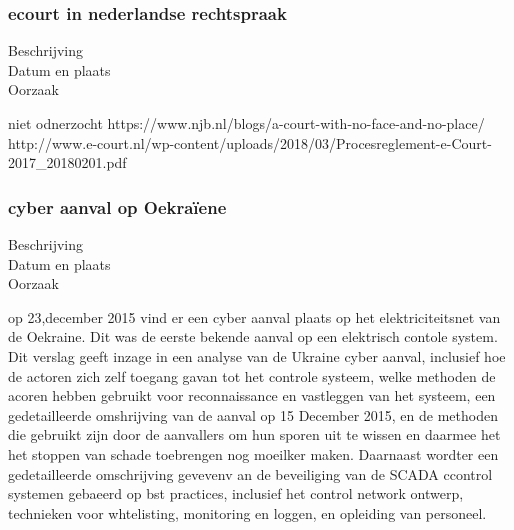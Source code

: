 \subsubsection{ecourt in nederlandse rechtspraak}

\begin{description}
\item[Beschrijving]
\item[Datum en plaats] 
\item[Oorzaak]
\end{description}
niet odnerzocht
https://www.njb.nl/blogs/a-court-with-no-face-and-no-place/ 
\cite{sprongken19032018CourtProcedureDigital}
http://www.e-court.nl/wp-content/uploads/2018/03/Procesreglement-e-Court-2017_20180201.pdf
\cite{PROCESREGLEMENTEcourt}


\subsubsection{ cyber aanval op Oekraïene }

\begin{description}
\item[Beschrijving]
\item[Datum en plaats] 
\item[Oorzaak]
\end{description}

op 23,december 2015  vind er een cyber aanval plaats op het elektriciteitsnet van de Oekraine. Dit was de eerste bekende aanval op een elektrisch contole  system.  Dit verslag geeft inzage in een analyse van de Ukraine cyber aanval,
inclusief hoe de actoren zich zelf toegang gavan tot het controle systeem, welke methoden de acoren hebben gebruikt voor reconnaissance en vastleggen van het systeem, een gedetailleerde omshrijving van de aanval op 15 December 2015, en de methoden die gebruikt zijn door de aanvallers om hun sporen uit te wissen en daarmee het het stoppen van schade toebrengen  nog moeilker maken. Daarnaast wordter  een gedetailleerde omschrijving gevevenv an de beveiliging van de SCADA ccontrol systemen gebaeerd op bst practices, inclusief het control network ontwerp, technieken voor whtelisting, monitoring en loggen, en  opleiding van personeel.
\cite{Whitehead2017ukrainepoweroutage}

\cite{noauthor_2022-nm}
\cite{zetter2016GridHack}


